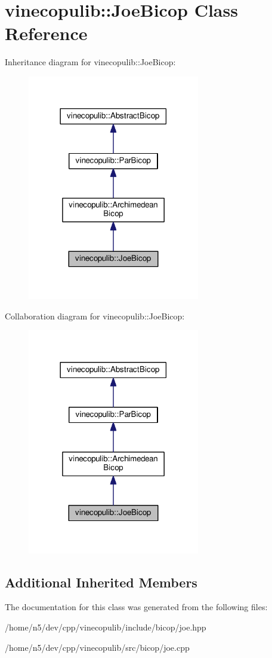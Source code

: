 \hypertarget{classvinecopulib_1_1_joe_bicop}{}\section{vinecopulib\+:\+:Joe\+Bicop Class Reference}
\label{classvinecopulib_1_1_joe_bicop}


Inheritance diagram for vinecopulib\+:\+:Joe\+Bicop\+:\nopagebreak
\begin{figure}[H]
\begin{center}
\leavevmode
\includegraphics[width=213pt]{classvinecopulib_1_1_joe_bicop__inherit__graph}
\end{center}
\end{figure}


Collaboration diagram for vinecopulib\+:\+:Joe\+Bicop\+:\nopagebreak
\begin{figure}[H]
\begin{center}
\leavevmode
\includegraphics[width=213pt]{classvinecopulib_1_1_joe_bicop__coll__graph}
\end{center}
\end{figure}
\subsection*{Additional Inherited Members}


The documentation for this class was generated from the following files\+:\begin{DoxyCompactItemize}
\item 
/home/n5/dev/cpp/vinecopulib/include/bicop/joe.\+hpp\item 
/home/n5/dev/cpp/vinecopulib/src/bicop/joe.\+cpp\end{DoxyCompactItemize}
